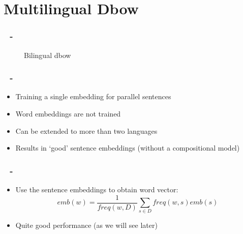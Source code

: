 \documentclass{beamer}
\newenvironment{dia}
{
\begin{frame}[fragile, environment=dia]
\frametitle{\insertsection
\ifx\insertsubsection\empty\else
      \,~-~\insertsubsection             %
   \fi}
}
{
\end{frame}
}
\begin{document}


\section{Multilingual Dbow}

\begin{dia}
\begin{figure}

\center
{}
\caption{Bilingual dbow}
\label{f:bilingual_dbow}
\end{figure}
\end{dia}

\begin{dia}
\begin{itemize}
\item Training a single embedding for parallel sentences
\item Word embeddings are not trained
\item Can be extended to more than two languages
\item Results in `good' sentence embeddings (without a compositional model)
\end{itemize}
\end{dia}

\begin{dia}
\begin{itemize}
\item Use the sentence embeddings to obtain word vector: 
\begin{equation*}
emb(w)=\frac{1}{freq(w,D)}\sum_{s\in D}freq(w,s) emb(s)
\end{equation*}
\item Quite good performance (as we will see later)
\end{itemize}
\end{dia}
\end{document}
